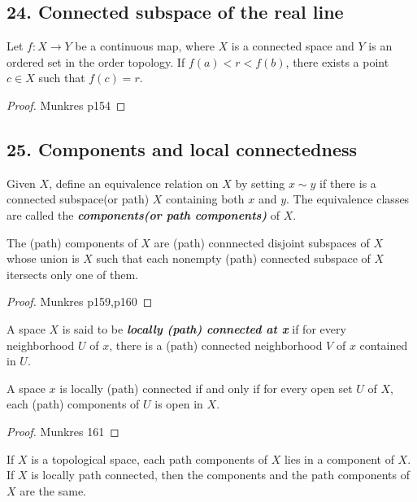 \subsection{24. Connected subspace of the real line}
\begin{mytheorem}
Let $f:X\to Y$ be a continuous map, where $X$ is a connected space and $Y$ is an ordered set in the order topology. If $f(a)<r<f(b)$, there exists a point $c\in X$ such that $f(c)=r$.
\end{mytheorem}
\begin{proof}
Munkres p154
\end{proof}

\subsection{25. Components and local connectedness}
\begin{mydefinition}
Given $X$, define an equivalence relation on $X$ by setting $x\sim y$ if there is a connected subspace(or path) $X$ containing both $x$ and $y$. The equivalence classes are called the \textbf{\emph{components(or path components)}} of $X$.
\end{mydefinition}

\begin{mytheorem}
The (path) components of $X$ are (path) connnected disjoint subspaces of $X$ whose union is $X$ such that each nonempty (path) connected subspace of $X$ itersects only one of them.
\end{mytheorem}
\begin{proof}
Munkres p159,p160
\end{proof}

\begin{mydefinition}
A space $X$ is said to be \textbf{\emph{locally (path) connected at x}} if for every neighborhood $U$ of $x$, there is a (path) connected neighborhood $V$ of $x$ contained in $U$. 
\end{mydefinition}

\begin{mytheorem}
A space $x$ is locally (path) connected if and only if for every open set $U$ of $X$, each (path) components of $U$ is open in $X$.
\end{mytheorem}
\begin{proof}
Munkres 161
\end{proof}

\begin{mytheorem}
If $X$ is a topological space, each path components of $X$ lies in a component of $X$. If $X$ is locally path connected, then the components and the path components of $X$ are the same.
\end{mytheorem}
